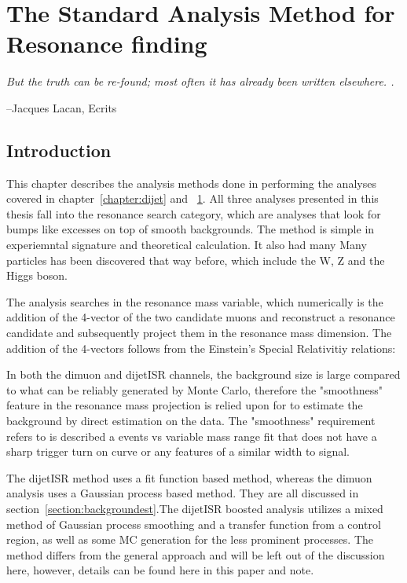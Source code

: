 \chapter{The Standard Analysis Method for Resonance finding}
\label{chapter:dimuon}

\epigraph{\textit{But the truth can be re-found; most often it has already been written elsewhere. .}}{--Jacques Lacan, Ecrits}

\section{Introduction}
This chapter describes the analysis methods done in performing the analyses covered in chapter~\ref{chapter:dijet} and ~\ref{chapter:dimuon}. 
All three analyses presented in this thesis fall into the resonance search category, which are analyses that look for bumps like excesses on top of smooth backgrounds. The method is simple in experiemntal signature and theoretical calculation. It also had many Many particles has been discovered that way before, which include the W, Z and the Higgs boson.

The analysis searches in the resonance mass variable, which numerically is the addition of the 4-vector of the two candidate muons and reconstruct a resonance candidate and subsequently project them in the resonance mass dimension. The addition of the 4-vectors follows from the Einstein's Special Relativitiy relations:

In both the dimuon and dijetISR channels, the background size is large compared to what can be reliably generated by Monte Carlo, therefore the "smoothness" feature in the resonance mass projection is relied upon for to estimate the background by direct estimation on the data. The "smoothness" requirement refers to is described a events vs variable mass range fit that does not have a sharp trigger turn on curve or any features of a similar width to signal. 

The dijetISR method uses a fit function based method, whereas the dimuon analysis uses a Gaussian process based method. They are all discussed in section~\ref{section:backgroundest}.The dijetISR boosted analysis utilizes a mixed method of Gaussian process smoothing and a transfer function from a control region, as well as some MC generation for the less prominent processes. The method differs from the general approach and will be left out of the discussion here, however,
details can be found here in this paper and note.

